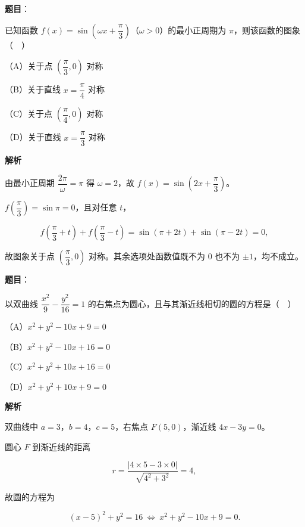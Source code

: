 \begin{answer}

\textbf{题目}：

已知函数 $f(x)=\sin\left(\omega x+\dfrac{\pi}3\right)$（$\omega>0$）的最小正周期为 $\pi$，则该函数的图象（　）

（A）关于点 $\left(\dfrac{\pi}3,0\right)$ 对称

（B）关于直线 $x=\dfrac{\pi}4$ 对称

（C）关于点 $\left(\dfrac{\pi}4,0\right)$ 对称

（D）关于直线 $x=\dfrac{\pi}3$ 对称

\textbf{解析}

由最小正周期 $\dfrac{2\pi}\omega=\pi$ 得 $\omega=2$，故 $f(x)=\sin\left(2x+\dfrac{\pi}3\right)$。

$f\left(\dfrac{\pi}3\right)=\sin\pi=0$，且对任意 $t$，

\nopagebreak[4]
\[f\left(\frac{\pi}3+t\right)+f\left(\frac{\pi}3-t\right)=\sin(\pi+2t)+\sin(\pi-2t)=0,\]

故图象关于点 $\left(\dfrac{\pi}3,0\right)$ 对称。其余选项处函数值既不为 $0$ 也不为 $\pm1$，均不成立。


\end{answer}
\begin{answer}

\textbf{题目}：

以双曲线 $\dfrac{x^2}9-\dfrac{y^2}{16}=1$ 的右焦点为圆心，且与其渐近线相切的圆的方程是（　）

（A）$x^2+y^2-10x+9=0$

（B）$x^2+y^2-10x+16=0$

（C）$x^2+y^2+10x+16=0$

（D）$x^2+y^2+10x+9=0$

\textbf{解析}

双曲线中 $a=3$，$b=4$，$c=5$，右焦点 $F(5,0)$，渐近线 $4x-3y=0$。

圆心 $F$ 到渐近线的距离

\nopagebreak[4]
\[r=\frac{|4\times5-3\times0|}{\sqrt{4^2+3^2}}=4,\]

故圆的方程为

\nopagebreak[4]
\[(x-5)^2+y^2=16\ \Longleftrightarrow\ x^2+y^2-10x+9=0.\]


\end{answer}
